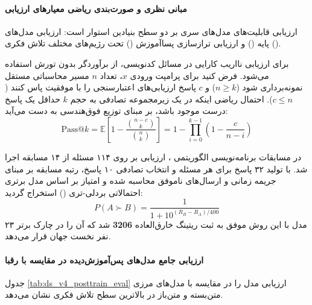 \item {}

\paragraph*{مبانی نظری و صورت‌بندی ریاضی معیارهای ارزیابی}
ارزیابی قابلیت‌های مدل‌های سری  \cite{deepseek2026v4} بر دو سطح بنیادین استوار است: ارزیابی مدل‌های پایه () و ارزیابی ترازسازی پساآموزش () تحت رژیم‌های مختلف تلاش فکری (). 

برای ارزیابی نااریب کارایی در مسائل کدنویسی، از برآوردگر بدون تورش  \cite{chen2021evaluating} استفاده می‌شود. فرض کنید برای پرامپت ورودی $x$، تعداد $n$ مسیر محاسباتی مستقل نمونه‌برداری شود ($n \ge k$) و $c$ پاسخ ارزیابی‌های اعتبارسنجی را با موفقیت پاس کنند ($c \le n$). احتمال ریاضی اینکه در یک زیرمجموعه تصادفی به حجم $k$ حداقل یک پاسخ درست موجود باشد، بر مبنای توزیع فوق‌هندسی به دست می‌آید:
\begin{equation}
    \text{Pass}@k = \mathbb{E}\left[ 1 - \frac{\binom{n-c}{k}}{\binom{n}{k}} \right] = 1 - \prod_{i=0}^{k-1} \left(1 - \frac{c}{n - i}\right)
\end{equation}

در مسابقات برنامه‌نویسی الگوریتمی ، ارزیابی بر روی ۱۱۴ مسئله از ۱۴ مسابقه  اجرا شد. با تولید ۳۲ پاسخ برای هر مسئله و انتخاب تصادفی ۱۰ پاسخ، رتبه مسابقه بر مبنای جریمه زمانی و ارسال‌های ناموفق محاسبه شده و امتیاز  بر اساس مدل برتری احتمالاتی بردلی-تری () استخراج گردید:
\begin{equation}
    P(A \succ B) = \frac{1}{1 + 10^{(R_B - R_A)/400}}
\end{equation}
مدل  با این روش موفق به ثبت ریتینگ خارق‌العاده \textbf{3206} شد که آن را در چارک برتر ۲۳ نفر نخست جهان قرار می‌دهد.

\paragraph*{ارزیابی جامع مدل‌های پس‌آموزش‌دیده در مقایسه با رقبا}
جدول \ref{tab:ds_v4_posttrain_eval} ارزیابی مدل  را در مقایسه با مدل‌های مرزی متن‌بسته و متن‌باز در بالاترین سطح تلاش فکری نشان می‌دهد.

